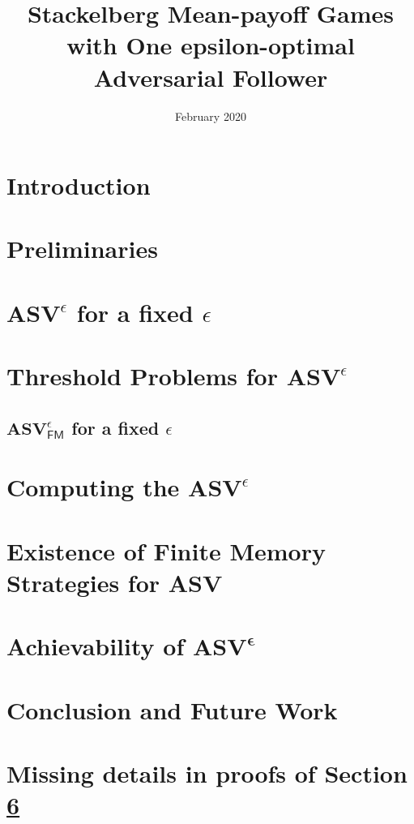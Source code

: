 \documentclass{article}
\title{\textbf{Stackelberg Mean-payoff Games with One epsilon-optimal Adversarial Follower}}
\author{}
\date{February 2020}
\begin{document}
\maketitle

\section{Introduction} 
  \label{sec:intro}
  

\section{Preliminaries}
  \label{sec:prelim}
  

\section{$\mathbf{ASV}^{\epsilon}$ for a fixed $\epsilon$}
  \label{sec:examples}
  

\section{Threshold Problems for $\mathbf{ASV}^{\epsilon}$}
  \label{sec:ThresholdProblem}
  
  \subsection{$\mathbf{ASV}^{\epsilon}_{\mathsf{FM}}$ for a fixed $\epsilon$}
    \label{sec:FMStrategy}
    

\section{Computing the $\mathbf{ASV}^{\epsilon}$}
  \label{sec:ComputeASV}
  

\section{Existence of Finite Memory Strategies for ASV}
  \label{sec:FMASV}
  

\section{Achievability of $\mathbf{ASV^{\epsilon}}$}
  \label{sec:Achievability}
  

\section{Conclusion and Future Work}
    \label{sec:conc}
    



\appendix
\pagebreak
\section{Missing details in proofs of Section \ref{sec:FMASV}}

\end{document}
